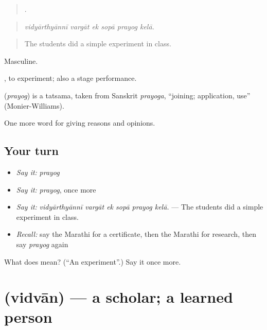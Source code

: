 \begin{quote}
     .
\end{quote}

\begin{quote}
\emph{vidyārthyānnī vargāt ek sopā prayog kelā.}
\end{quote}

\begin{quote}
The students did a simple experiment in class.
\end{quote}

Masculine.

 , to experiment; also a stage performance.

\begin{cousinweb}
\textbf{} (\emph{prayog}) is a tatsama, taken from Sanskrit \emph{prayoga}, \textquotedblleft{}joining; application, use\textquotedblright{} (Monier-Williams).
\end{cousinweb}

\begin{grammarlens}[title={What you've built}]
One more word for giving reasons and opinions.
\end{grammarlens}

\subsection*{Your turn}
\begin{itemize}
\raggedright
  \item \emph{Say it:} \emph{prayog}
  \item \emph{Say it:} \emph{prayog}, once more
  \item \emph{Say it:} \emph{vidyārthyānnī vargāt ek sopā prayog kelā.} — The students did a simple experiment in class.
  \item \emph{Recall:} say the Marathi for a certificate, then the Marathi for research, then say \emph{prayog} again
\end{itemize}

\begin{tcolorbox}[breakable,colback=teal!4,colframe=teal!35!black,title={Before you move on}]
What does  mean? (\textquotedblleft{}An experiment\textquotedblright{}.) Say it once more.
\end{tcolorbox}
\section[\texorpdfstring{\mr{विद्वान} (vidvān)}{विद्वान (vidvān)}]{ (vidvān) — a scholar; a learned person}

